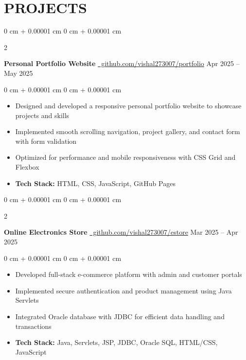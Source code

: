 \documentclass[10pt, letterpaper]{article}
\newcommand{\githublink}[1]{\href{https://github.com/vishal273007/#1}{\textcolor{primaryColor}{\faGithub\ github.com/vishal273007/#1}}}
\newenvironment{onecolentry}{
    \begin{adjustwidth}{
        0 cm + 0.00001 cm
    }{
        0 cm + 0.00001 cm
    }
}{
    \end{adjustwidth}
} %
\newenvironment{twocolentry}[2][]{
    \onecolentry
    \def\secondColumn{#2}
    \setcolumnwidth{\fill, 4.5 cm}
    \begin{paracol}{2}
}{
    \switchcolumn \raggedleft \secondColumn
    \end{paracol}
    \endonecolentry
} %
\begin{document}
    \section{PROJECTS}
        \vspace{0.2 cm}
        
        \begin{twocolentry}{
            Apr 2025 – May 2025
        }
            \textbf{Personal Portfolio Website} \hfill\githublink{portfolio}\end{twocolentry}

        \vspace{0.10 cm}
        \begin{onecolentry}
            \begin{itemize}[leftmargin=*,noitemsep,topsep=0pt]
                \item Designed and developed a responsive personal portfolio website to showcase projects and skills
                \item Implemented smooth scrolling navigation, project gallery, and contact form with form validation
                \item Optimized for performance and mobile responsiveness with CSS Grid and Flexbox
                \item \textbf{Tech Stack:} HTML, CSS, JavaScript, GitHub Pages
            \end{itemize}
        \end{onecolentry}


        \vspace{0.2 cm}

        \begin{twocolentry}{
            Mar 2025 – Apr 2025
        }
            \textbf{Online Electronics Store} \hfill\githublink{estore}\end{twocolentry}
        
        \vspace{0.10 cm}
        \begin{onecolentry}
            \begin{itemize}[leftmargin=*,noitemsep,topsep=0pt]
                \item Developed full-stack e-commerce platform with admin and customer portals
                \item Implemented secure authentication and product management using Java Servlets
                \item Integrated Oracle database with JDBC for efficient data handling and transactions
                \item \textbf{Tech Stack:} Java, Servlets, JSP, JDBC, Oracle SQL, HTML/CSS, JavaScript
            \end{itemize}
        \end{onecolentry}
    
\end{document}
